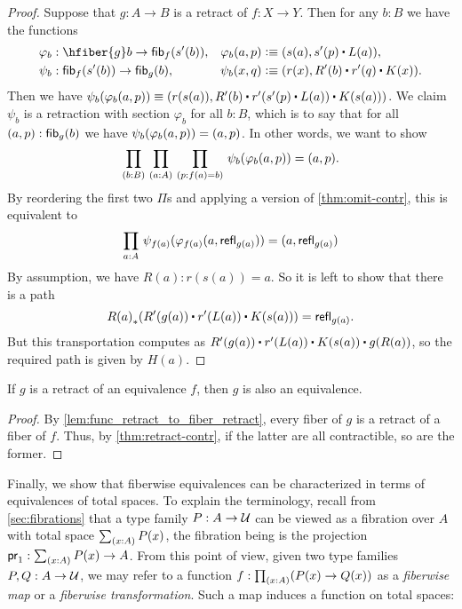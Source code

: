\begin{proof}
Suppose that $g:A\to B$ is a retract of $f:X\to Y$. Then for any $b:B$ we have the functions
\begin{align*}
\varphi_b &:\hfiber{g}b\to\hfib{f}{s^\prime(b)}, &
\varphi_b(a,p) & \defeq \pairr{s(a),s^\prime(p)\ct L(a)},\\
\psi_b &:\hfib{f}{s^\prime(b)}\to\hfib{g}b, &
\psi_b(x,q) &\defeq \pairr{r(x),R^\prime(b)\ct r^\prime(q)\ct K(x)}.
\end{align*}
Then we have $\psi_b(\varphi_b({a,p}))\equiv\pairr{r(s(a)),R^\prime(b)\ct r^\prime(s^\prime(p)\ct L(a))\ct K(s(a))}$.
We claim $\psi_b$ is a retraction with section $\varphi_b$ for all $b:B$, which is to say that for all $(a,p):{\mathsf{fib}}_{g}(b)$ we have $\psi_b(\varphi_b({a,p}))= {\mathopen{}(a,p)\mathclose{}}$.
In other words, we want to show
\begin{equation*}
\prd{b:B}{a:A}{p:f(a)=b} \psi_b(\varphi_b({a,p}))= \pairr{a,p}.
\end{equation*}
By reordering the first two $\Pi$s and applying a version of \autoref{thm:omit-contr}, this is equivalent to
\begin{equation*}
\prd{a:A}\psi_{f(a)}(\varphi_{f(a)}({a,\refl{g(a)}}))=\pairr{a,\refl{g(a)}}
\end{equation*}
By assumption, we have $R(a):r(s(a))= a$. So it is left to show that there is a path
\begin{equation*}
\trans{R(a)}{R^\prime(g(a))\ct r^\prime(L(a))\ct K(s(a))} = \refl{g(a)}.
\end{equation*}
But this transportation computes as $R^\prime(g(a))\ct r^\prime(L(a))\ct K(s(a))\ct g(R(a))$, so the required path is given by $H(a)$.
\end{proof}

\begin{thm}\label{thm:retract-equiv}
  If $g$ is a retract of an equivalence $f$, then $g$ is also an equivalence.
\end{thm}
\begin{proof}
  By \autoref{lem:func_retract_to_fiber_retract}, every fiber of $g$ is a retract of a fiber of $f$.
  Thus, by \autoref{thm:retract-contr}, if the latter are all contractible, so are the former.
\end{proof}

Finally, we show that fiberwise equivalences can be characterized in terms of equivalences of total spaces.
To explain the terminology, recall from \autoref{sec:fibrations} that a type family $P:A\to\mathcal{U}$ can be viewed as a fibration over $A$ with total space $\sm{x:A} P(x)$, the fibration being is the projection $\proj1:\sm{x:A} P(x) \to A$.
From this point of view, given two type families $P,Q:A\to\mathcal{U}$, we may refer to a function $f:\prd{x:A} (P(x)\to Q(x))$ as a \emph{fiberwise map} or a \emph{fiberwise transformation}.
Such a map induces a function on total spaces:

